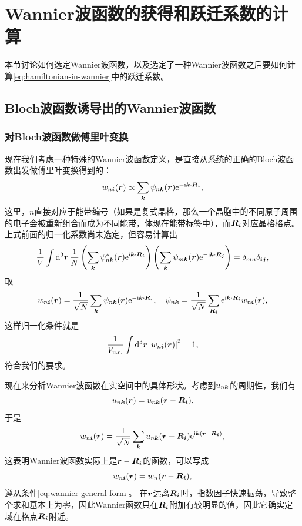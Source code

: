 \section{Wannier波函数的获得和跃迁系数的计算}

本节讨论如何选定Wannier波函数，以及选定了一种Wannier波函数之后要如何计算\eqref{eq:hamiltonian-in-wannier}中的跃迁系数。

\subsection{Bloch波函数诱导出的Wannier波函数}

\subsubsection{对Bloch波函数做傅里叶变换}

现在我们考虑一种特殊的Wannier波函数定义，是直接从系统的正确的Bloch波函数出发做傅里叶变换得到的：
\[
    w_{n\vb*{i}}(\vb*{r}) \propto \sum_{\vb*{k}} \psi_{n\vb*{k}}(\vb*{r}) \mathrm{e}^{- \mathrm{i} \vb*{k} \cdot \vb*{R}_{\vb*{i}}},
\]
这里，$n$直接对应于能带编号（如果是复式晶格，那么一个晶胞中的不同原子周围的电子会被重新组合而成为不同能带，体现在能带标签中），而$\vb*{R}_{\vb*{i}}$对应晶格格点。
上式前面的归一化系数尚未选定，但容易计算出
\[
    \frac{1}{V} \int \dd[3]{\vb*{r}} \frac{1}{N} \left( \sum_{\vb*{k}} \psi^*_{n\vb*{k}}(\vb*{r}) \mathrm{e}^{\mathrm{i} \vb*{k} \cdot \vb*{R}_{\vb*{i}}} \right) \left( \sum_{\vb*{k}} \psi_{m\vb*{k}}(\vb*{r}) \mathrm{e}^{- \mathrm{i} \vb*{k} \cdot \vb*{R}_{\vb*{j}}} \right) = \delta_{mn} \delta_{\vb*{i} \vb*{j}},
\]
取
\begin{equation}
    w_{n\vb*{i}}(\vb*{r}) = \frac{1}{\sqrt{N}} \sum_{\vb*{k}} \psi_{n\vb*{k}}(\vb*{r}) \mathrm{e}^{-\mathrm{i} \vb*{k} \cdot \vb*{R}_{\vb*{i}}}, \quad \psi_{n\vb*{k}} = \frac{1}{\sqrt{N}} \sum_{\vb*{R}_{\vb*{i}}} \mathrm{e}^{\mathrm{i} \vb*{k} \cdot \vb*{R}_{\vb*{i}}} w_{n \vb*{i}}(\vb*{r}),
    \label{eq:wannier-from-bloch}
\end{equation}
这样归一化条件就是
\begin{equation}
    \frac{1}{V_\text{u.c.}} \int \dd[3]{\vb*{r}} \abs{w_{n \vb*{i}}(\vb*{r})}^2 = 1,
\end{equation}
符合我们的要求。

现在来分析Wannier波函数在实空间中的具体形状。考虑到$u_{n\vb*{k}}$的周期性，我们有
\[
    u_{n\vb*{k}} (\vb*{r}) = u_{n\vb*{k}} (\vb*{r} - \vb*{R}_{\vb*{i}}),
\]
于是
\begin{equation}
    w_{n \vb*{i}}(\vb*{r}) = \frac{1}{\sqrt{N}} \sum_{\vb*{k}} u_{n\vb*{k}} (\vb*{r} - \vb*{R}_{\vb*{i}}) \mathrm{e}^{\mathrm{i} \vb*{k} (\vb*{r} - \vb*{R}_{\vb*{i}})},
\end{equation}
这表明Wannier波函数实际上是$\vb*{r} - \vb*{R}_{\vb*{i}}$的函数，可以写成
\begin{equation}
    w_{n\vb*{i}}(\vb*{r}) = w_{n}(\vb*{r} - \vb*{R}_{\vb*{i}}),
\end{equation}
遵从条件\eqref{eq:wannier-general-form}。
在$\vb*{r}$远离$\vb*{R}_{\vb*{i}}$时，指数因子快速振荡，导致整个求和基本上为零，因此Wannier函数只在$\vb*{R}_{\vb*{i}}$附加有较明显的值，因此它确实定域在格点$\vb*{R}_{\vb*{i}}$附近。

